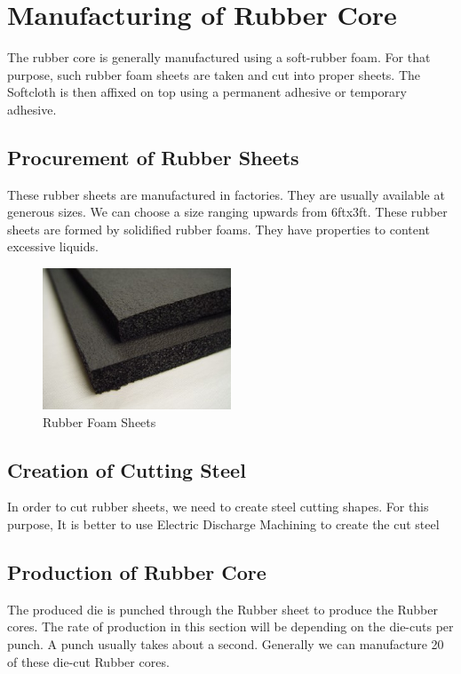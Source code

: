 \documentclass[12pt,a4paper,oneside]{article}
\begin{document}
\newpage

\section{Manufacturing of Rubber Core}

The rubber core is generally manufactured using a soft-rubber foam. For that purpose, such rubber foam sheets are taken and cut into proper sheets. The Softcloth is then affixed on top using a permanent adhesive or temporary adhesive. 

\subsection{Procurement of Rubber Sheets}

These rubber sheets are manufactured in factories. They are usually available at generous sizes. We can choose a size ranging upwards from 6ftx3ft. These rubber sheets are formed by solidified rubber foams. They have properties to content excessive liquids. 

\begin{figure}[h]
    \centering
    \includegraphics[width=0.5\textwidth]{rubber-foam}
    \caption{Rubber Foam Sheets}
\end{figure}



\subsection{Creation of Cutting Steel}

In order to cut rubber sheets, we need to create steel cutting shapes. For this purpose, It is better to use Electric Discharge Machining to create the cut steel

\subsection{Production of Rubber Core}

The produced die is punched through the Rubber sheet to produce the Rubber cores. The rate of production in this section will be depending on the die-cuts per punch. A punch usually takes about a second. Generally we can manufacture 20 of these die-cut Rubber cores. 
\end{document}
